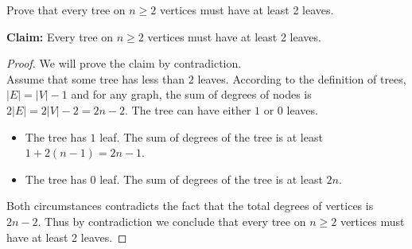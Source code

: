 \documentclass[11pt]{article}
\begin{document}
\begin{Parts}
    \Part Prove that every tree on $n\geq 2$ vertices must have at least 2 leaves. 
    \begin{Answer}
        \textbf{Claim:} Every tree on $n\geq 2$ vertices must have at least 2 leaves. 
        \begin{proof}
            We will prove the claim by contradiction. \\ 
            Assume that some tree has less than $2$ leaves. According to the definition of trees, $|E|=|V|-1$ and for any
            graph, the sum of degrees of nodes is $2|E|=2|V|-2=2n-2$. The tree can have either $1$ or $0$ leaves.
            \begin{itemize}
                \item The tree has $1$ leaf. The sum of degrees of the tree is at least $1+2(n-1)=2n-1$. 
                \item The tree has $0$ leaf. The sum of degrees of the tree is at least $2n$. 
            \end{itemize}
            Both circumstances contradicts the fact that the total degrees of vertices is $2n-2$. Thus by contradiction
            we conclude that every tree on $n \geq 2$ vertices must have at least 2 leaves.  
        \end{proof}
    \end{Answer}
\end{Parts}

\newpage
{}
\end{document}
